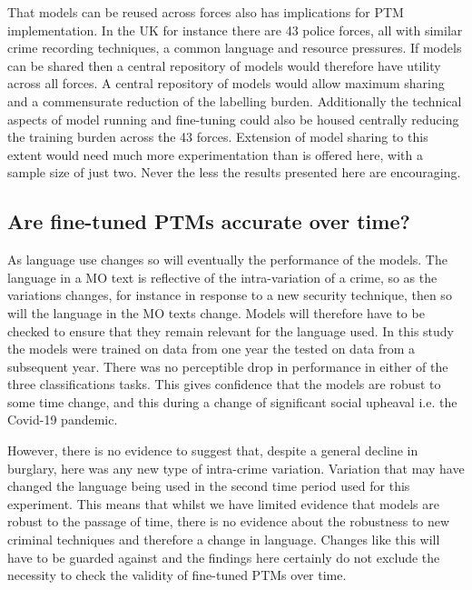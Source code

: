 That models can be reused across forces also has implications for PTM implementation. In the UK for instance there are 43 police forces, all with similar crime recording techniques, a common language and resource pressures. If models can be shared then a central repository of models would therefore have utility across all forces. A central repository of models would allow maximum sharing and a commensurate reduction of the labelling burden. Additionally the technical aspects of model running and fine-tuning could also be housed centrally reducing the training burden across the 43 forces. Extension of model sharing to this extent would need much more experimentation than is offered here, with a sample size of just two. Never the less the results presented here are encouraging.


\subsection{Are fine-tuned PTMs accurate over time?} As language use changes so will eventually the performance of the models. The language in a MO text is reflective of the intra-variation of a crime, so as the variations changes, for instance in response to a new security technique, then so will the language in the MO texts change. Models will therefore have to be checked to ensure that they remain relevant for the language used. In this study the models were trained on data from one year the tested on data from a subsequent year. There was no perceptible drop in performance in either of the three classifications tasks. This gives confidence that the models are robust to some time change, and this during a change of significant social upheaval i.e. the Covid-19 pandemic. 

However, there is no evidence to suggest that, despite a general decline in burglary, here was any new type of intra-crime variation. Variation that may have changed the language being used in the second time period used for this experiment. This means that whilst we have limited evidence that models are robust to the passage of time, there is no evidence about the robustness to new criminal techniques and therefore a change in language. Changes like this will have to be guarded against and the findings here certainly do not exclude the necessity to check the validity of fine-tuned PTMs over time.


